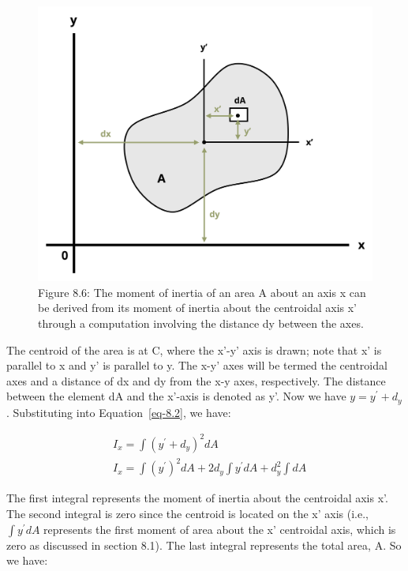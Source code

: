 \documentclass[
  letterpaper,
  DIV=11,
  numbers=noendperiod]{scrreprt}
\theoremstyle{definition}
\theoremstyle{remark}
\begin{document}
\begin{figure}[H]

{\centering \includegraphics[width=4.47917in,height=\textheight]{images/CH 8 PNGs/figure 8.6.png}

}

\caption{Figure 8.6: The moment of inertia of an area A about an axis x
can be derived from its moment of inertia about the centroidal axis x'
through a computation involving the distance dy between the axes.}

\end{figure}%

The centroid of the area is at C, where the x'-y' axis is drawn; note
that x' is parallel to x and y' is parallel to y. The x-y' axes will be
termed the centroidal axes and a distance of dx and dy from the x-y
axes, respectively. The distance between the element dA and the x'-axis
is denoted as y'. Now we have \(y=y^{\prime}+d_y\). Substituting into
Equation~\ref{eq-8.2}, we have:

\[
\begin{aligned}
& I_x=\int\left(y^{\prime}+d_y\right)^2 d A \\
& I_x=\int\left(y^{\prime}\right)^2 d A+2 d_y \int y^{\prime} d A+d_y^2 \int d A
\end{aligned}
\]

The first integral represents the moment of inertia about the centroidal
axis x'. The second integral is zero since the centroid is located on
the x' axis (i.e., \(\int y^{\prime} d A\) represents the first moment
of area about the x' centroidal axis, which is zero as discussed in
section 8.1). The last integral represents the total area, A. So we
have:
\end{document}

